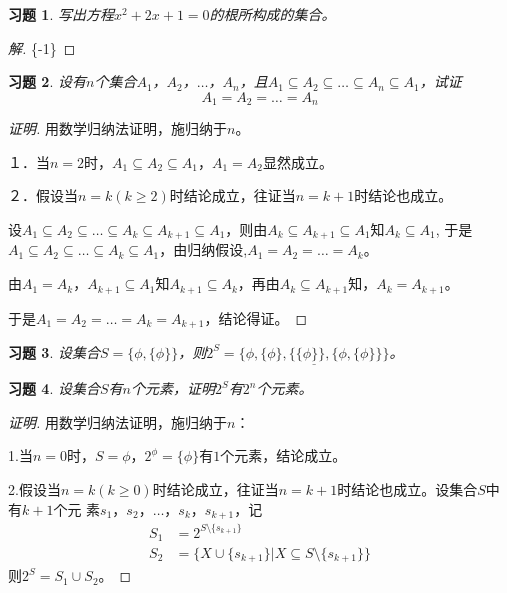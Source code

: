 \documentclass{article}
\begin{document}
\begin{CJK}{UTF8}{gbsn}
\newtheorem{Exercise}{习题}
\begin{Exercise}
  写出方程$x^2+2x+1=0$的根所构成的集合。
\end{Exercise}
\begin{proof}[解]
  \{-1\}
\end{proof}
\begin{Exercise}
  设有$n$个集合$A_1$，$A_2$，$\ldots$，$A_n$，且$A_1\subseteq A_2\subseteq \ldots \subseteq A_n \subseteq A_1$，试证
  \[A_1 = A_2 = \ldots = A_n\]
\end{Exercise}
\begin{proof}[证明]
  用数学归纳法证明，施归纳于$n$。
  
  １．当$n=2$时，$A_1\subseteq A_2 \subseteq A_1$，$A_1=A_2$显然成立。

  ２．假设当$n=k(k\geq 2)$时结论成立，往证当$n=k+1$时结论也成立。

  设$A_1\subseteq A_2\subseteq \ldots \subseteq A_{k} \subseteq A_{k+1} \subseteq A_1$，则由$A_{k} \subseteq A_{k+1} \subseteq A_1$知$A_{k} \subseteq A_1$,
  于是$A_1\subseteq A_2\subseteq \ldots \subseteq A_{k} \subseteq A_1$，由归纳假设,$A_1 = A_2 = \ldots = A_k$。

  由$A_1=A_k$，$A_{k+1}\subseteq A_1$知$A_{k+1} \subseteq A_k$，再由$A_{k}\subseteq A_{k+1}$知，$A_k=A_{k+1}$。
  
  于是$A_1=A_2=\ldots = A_k = A_{k+1}$，结论得证。
\end{proof}


\begin{Exercise}
  设集合$S=\{\phi, \{\phi\}\}$，则$2^S=\underline{\{\phi, \{\phi\},\{\{\phi\}\},\{\phi, \{\phi\}\}\}}$。
\end{Exercise}
\begin{Exercise}
  设集合$S$有$n$个元素，证明$2^S$有$2^n$个元素。
\end{Exercise}
\begin{proof}[证明]
  用数学归纳法证明，施归纳于$n$：

  1.当$n=0$时，$S=\phi$，$2^{\phi} = \{\phi\}$有$1$个元素，结论成立。

  2.假设当$n=k(k\geq
  0)$时结论成立，往证当$n=k+1$时结论也成立。设集合$S$中有$k+1$个元
  素$s_1$，$s_2$，$\ldots$，$s_k$，$s_{k+1}$，记
  \begin{align*}
    S_1&=2^{S\setminus \{s_{k+1}\}}\\
    S_2&=\{X\cup \{s_{k+1}\}|X\subseteq S\setminus \{s_{k+1}\}\}
  \end{align*}
  则$2^S = S_1\cup S_2$。


\end{proof}
\end{CJK}
\end{document}
